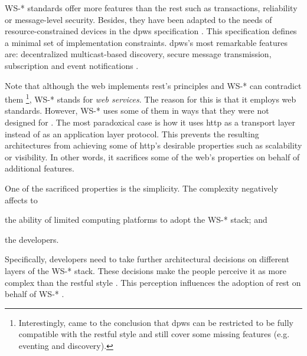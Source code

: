 WS-* standards offer more features than the \ac{rest} such as transactions, reliability or message-level security.
Besides, they have been adapted to the needs of resource-constrained devices in the \ac{dpws} specification .
This specification defines a minimal set of implementation constraints.
\ac{dpws}'s most remarkable features are: decentralized multicast-based discovery, secure message transmission, subscription and event notifications \citep{moritz_devices_2010}.


Note that although the web implements \ac{rest}'s principles and WS-* can contradict them
\footnote{Interestingly, \citet{moritz_devices_2010} came to the conclusion that \ac{dpws} can be restricted to be fully compatible with the \ac{rest}ful style and still cover some missing features (e.g. eventing and discovery).},
WS-* stands for \emph{web services}. %
The reason for this is that it employs web standards. %
However, WS-* uses some of them in ways that they were not designed for \citep{krummenacher_www_2005}.
The most paradoxical case is how it uses \ac{http} as a transport layer instead of as an application layer protocol.
This prevents the resulting architectures from achieving some of \ac{http}'s desirable properties such as scalability or visibility.
In other words, it sacrifices some of the web's properties on behalf of additional features.


One of the sacrificed properties is the simplicity.
The complexity negatively affects to
\begin{enumerate*}[label=\itshape(\arabic*\upshape)]
  \item the ability of limited computing platforms to adopt the WS-* stack; and %
  \item the developers.
\end{enumerate*}
Specifically, developers need to take further architectural decisions on different layers of the WS-* stack.
These decisions make the people perceive it as more complex than the \ac{rest}ful style \citep{guinard_search_2011}.
This perception influences the adoption of \ac{rest} on behalf of WS-* \citep{davis_perceived_1989,legris_why_2003}.


